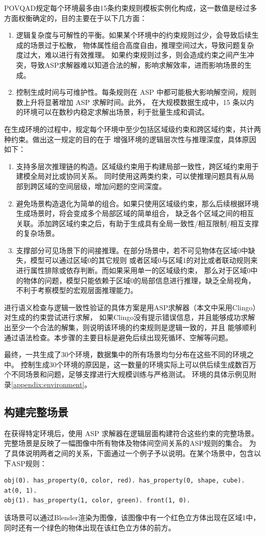 POVQAD规定每个环境最多由15条约束规则模板实例化构成，这一数值是经过多方面权衡确定的，目的主要在于以下几方面：
\begin{enumerate}[nosep]
\item 逻辑复杂度与可解性的平衡。如果某个环境中的约束规则过少，会导致后续生成的场景过于松散，
物体属性组合高度自由，推理空间过大，导致问题复杂度过大，难以进行有效推理。
如果约束规则过多，则会造成约束之间产生冲突，导致ASP求解器难以知道合法的解，影响求解效率，进而影响场景的生成。
\item 控制生成时间与可维护性。每条规则在 ASP 中都可能极大影响解空间，规则数上升将显著增加 ASP 求解时间。此外，
在大规模数据生成中，15 条以内的环境可以在数秒内稳定求解出场景，利于批量生成和调试。
\end{enumerate}

在生成环境的过程中，规定每个环境中至少包括区域级约束和跨区域约束，共计两种约束。做出这一规定的目的在于
增强环境的逻辑层次性与推理深度，具体原因如下：
\begin{enumerate}[nosep]
\item 支持多层次推理链的构造。区域级约束用于构建局部一致性，跨区域约束用于建模全局对比或协同关系。
同时使用这两类约束，可以使推理问题具有从局部到跨区域的空间层级，增加问题的空间深度。
\item 避免场景构造退化为简单的组合。如果只使用区域级约束，那么后续根据环境生成场景时，将会变成多个局部区域的简单组合，
缺乏各个区域之间的相互关联。添加跨区域约束之后，有助于生成具有全局一致性/相互限制/相互支撑的复杂场景。
\item 支撑部分可见场景下的间接推理。在部分场景中，若不可见物体在区域0中缺失，模型可以通过区域0的其它规则
或者区域0与区域1的对比或者联动规则来进行属性排除或依存判断。而如果采用单一的区域级约束，
那么对于区域0中的物体的问题，模型只能依赖于区域0的局部信息进行推理，缺乏全局视角，不利于考察模型的宏观层面推理能力。
\end{enumerate}

进行语义检查与逻辑一致性验证的具体方案是用ASP求解器（本文中采用Clingo）对生成的约束尝试进行求解，
如果Clingo没有提示错误信息，并且能够成功求解出至少一个合法的解集，则说明该环境的约束规则是逻辑一致的，并且
能够顺利通过语法检查。本步骤的主要目标是避免后续出现死循环、空解等问题。

最终，一共生成了30个环境，数据集中的所有场景均匀分布在这些不同的环境之中。
控制生成30个环境的原因是，这一数量的环境实际上可以供后续生成数百万个不同场景和问题，足够支撑进行大规模训练与严格测试。
环境的具体示例见附录\ref{appendix:environment}。

\subsection{构建完整场景}
在获得特定环境后，使用 ASP 求解器在逻辑层面构建符合这些约束的完整场景。
完整场景是反映了一幅图像中所有物体及物体间空间关系的ASP规则的集合。
为了具体说明两者之间的关系，下面通过一个例子予以说明。在某个场景中，包含以下ASP规则：
\begin{lstlisting}
obj(0). has_property(0, color, red). has_property(0, shape, cube). at(0, 1).
obj(1). has_property(1, color, green). front(1, 0).
\end{lstlisting}
该场景可以通过Blender渲染为图像，该图像中有一个红色立方体出现在区域1中，
同时还有一个绿色的物体出现在该红色立方体的前方。

